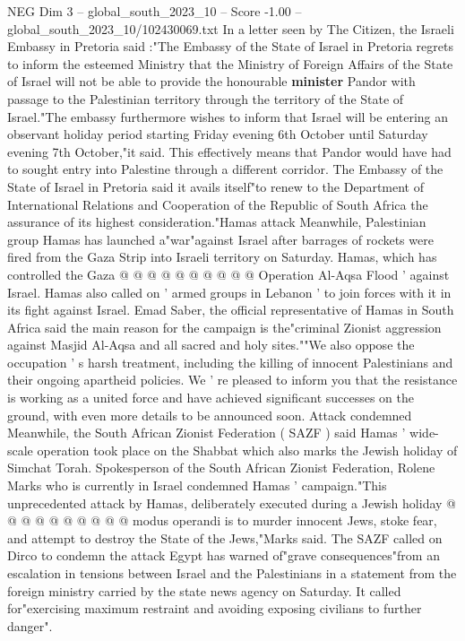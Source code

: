 \begin{textsample}{NEG Dim 3 – global\_south\_2023\_10 – Score -1.00 – global\_south\_2023\_10/102430069.txt}  \label{ex:f3_neg_024}
In a letter seen by The Citizen, the Israeli Embassy in Pretoria said :"The Embassy of the State of Israel in Pretoria regrets to inform the esteemed Ministry that the Ministry of Foreign Affairs of the State of Israel will not be able to provide the honourable \textbf{minister} Pandor with passage to the Palestinian territory through the territory of the State of Israel."The embassy furthermore wishes to inform that Israel will be entering an observant holiday period starting Friday evening 6th October until Saturday evening 7th October,"it said.
This effectively means that Pandor would have had to sought entry into Palestine through a different corridor.
The Embassy of the State of Israel in Pretoria said it avails itself"to renew to the Department of International Relations and Cooperation of the Republic of South Africa the assurance of its highest consideration."Hamas attack Meanwhile, Palestinian group Hamas has launched a"war"against Israel after barrages of rockets were fired from the Gaza Strip into Israeli territory on Saturday.
Hamas, which has controlled the Gaza @ @ @ @ @ @ @ @ @ @ Operation Al-Aqsa Flood ' against Israel.
Hamas also called on ' armed groups in Lebanon ' to join forces with it in its fight against Israel.
Emad Saber, the official representative of Hamas in South Africa said the main reason for the campaign is the"criminal Zionist aggression against Masjid Al-Aqsa and all sacred and holy sites.""We also oppose the occupation ' s harsh treatment, including the killing of innocent Palestinians and their ongoing apartheid policies.
We ' re pleased to inform you that the resistance is working as a united force and have achieved significant successes on the ground, with even more details to be announced soon.
Attack condemned Meanwhile, the South African Zionist Federation ( SAZF ) said Hamas ' wide-scale operation took place on the Shabbat which also marks the Jewish holiday of Simchat Torah.
Spokesperson of the South African Zionist Federation, Rolene Marks who is currently in Israel condemned Hamas ' campaign."This unprecedented attack by Hamas, deliberately executed during a Jewish holiday @ @ @ @ @ @ @ @ @ @ modus operandi is to murder innocent Jews, stoke fear, and attempt to destroy the State of the Jews,"Marks said.
The SAZF called on Dirco to condemn the attack Egypt has warned of"grave consequences"from an escalation in tensions between Israel and the Palestinians in a statement from the foreign ministry carried by the state news agency on Saturday.
It called for"exercising maximum restraint and avoiding exposing civilians to further danger".

\end{textsample}
